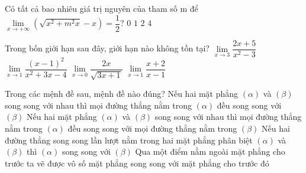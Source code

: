 	\begin{ex}%
		Có tất cả bao nhiêu giá trị nguyên của tham số m để $\displaystyle\lim\limits_{x\to +\infty}(\sqrt{{x^2+m^2x}}-x)=\dfrac{1}{2}$?
		\choice
		{$0$}
		{$1$}
		{\True $2$}
		{$4$}
	\end{ex}
	\begin{ex}%
		Trong bốn giới hạn sau đây, giới hạn nào không tồn tại?
		\choice
		{$\displaystyle\lim\limits_{x\to 3}\dfrac{2x+5}{x^2-3}$}
		{$\displaystyle\lim\limits_{x\to 1}\dfrac{(x-1)^2}{x^2+3x-4}$}
		{$\displaystyle\lim\limits_{x\to 0}\dfrac{2x}{\sqrt{3x+1}}$}
		{\True $\displaystyle\lim\limits_{x\to 1}\dfrac{x+2}{x-1}$}
	\end{ex}
\begin{ex}%
		Trong các mệnh đề sau, mệnh đề nào đúng?
		\choice
		{\True Nếu hai mặt phẳng $\left (\alpha\right )$ và $\left (\beta\right )$ song song với nhau thì mọi đường thẳng nằm trong $\left (\alpha\right )$ đều song song với $\left (\beta\right )$ }
		{Nếu hai mặt phẳng $\left (\alpha\right )$ và $\left (\beta\right )$ song song với nhau thì mọi đường thẳng nằm trong $\left (\alpha\right )$ đều song song với mọi đường thẳng nằm trong $\left (\beta\right )$}
		{Nếu hai đường thẳng song song lần lượt nằm trong hai mặt phẳng phân biệt $\left (\alpha\right )$ và $\left (\beta\right )$ thì $\left (\alpha\right )$ song song với $\left (\beta\right )$}
		{Qua một điểm nằm ngoài mặt phẳng cho trước ta vẽ được vô số mặt phẳng song song với mặt phẳng cho trước đó}
		\end{ex}
